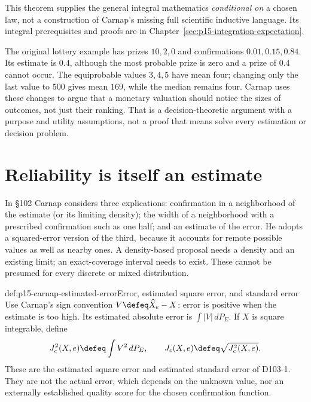 This theorem supplies the general integral mathematics \emph{conditional
on} a chosen law, not a construction of Carnap's missing full scientific
inductive language. Its integral prerequisites and proofs are in
Chapter~\ref{sec:p15-integration-expectation}.

The original lottery example has prizes \(10,2,0\) and confirmations
\(0.01,0.15,0.84\). Its estimate is \(0.4\), although the most
probable prize is zero and a prize of \(0.4\) cannot occur. The
equiprobable values \(3,4,5\) have mean four; changing only the last
value to \(500\) gives mean \(169\), while the median remains
four. Carnap uses these changes to argue that a monetary valuation
should notice the sizes of outcomes, not just their ranking. That is a
decision-theoretic argument with a purpose and utility assumptions, not
a proof that means solve every estimation or decision problem.

\section{Reliability is itself an estimate}
\label{sec:p15-carnap-reliability}

In §102 Carnap considers three explications: confirmation in a
neighborhood of the estimate (or its limiting density); the width of
a neighborhood with a prescribed confirmation such as one half;
and an estimate of the error. He adopts a squared-error version of the
third, because it accounts for remote possible values as well as nearby
ones. A density-based proposal needs a density and an existing limit;
an exact-coverage interval needs to exist. These cannot be presumed
for every discrete or mixed distribution.

\begin{hbdefinition}{def:p15-carnap-estimated-error}{Error, estimated square error, and standard error}
Use Carnap's sign convention \(V\defeq\widehat X_e-X\): error is
positive when the estimate is too high. Its estimated absolute error
is \(\int|V|\,dP_E\). If \(X\) is square integrable, define
\[
 J_c^2(X,e)\defeq\int V^2\,dP_E,\qquad
 J_c(X,e)\defeq\sqrt{J_c^2(X,e)}.
\]
These are the estimated square error and estimated standard error of
D103-1. They are not the actual error, which depends on the unknown
value, nor an externally established quality score for the chosen
confirmation function.
\end{hbdefinition}


